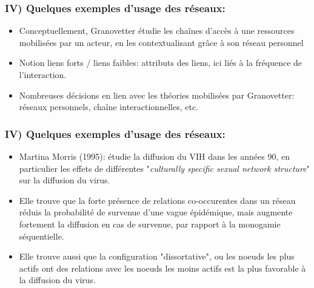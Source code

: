\documentclass{beamer}
\begin{document}
\begin{frame}
    \frametitle{IV) Quelques exemples d'usage des réseaux:}
    \begin{itemize}
        \item Conceptuellement, Granovetter étudie les chaînes d'accès à une ressources mobilisées par un acteur, en les contextualisant grâce à son réseau personnel
        \item Notion liens forts / liens faibles: attributs des liens, ici liés à la fréquence de l'interaction.
        \item Nombreuses décisions en lien avec les théories mobilisées par Granovetter: réseaux personnels, chaîne interactionnelles, etc.
    \end{itemize}
\end{frame}

\begin{frame}
    \frametitle{IV) Quelques exemples d'usage des réseaux:}
    \begin{itemize}
        \item Martina Morris (1995): étudie la diffusion du VIH dans les années 90, en particulier les effets de différentes "\emph{culturally specific sexual network structure}" sur la diffusion du virus.
        \item Elle trouve que la forte présence de relations co-occurentes dans un réseau réduis la probabilité de survenue d'une vague épidémique, mais augmente fortement la diffusion en cas de survenue, par rapport à la monogamie séquentielle. 
        \item Elle trouve aussi que la configuration "dissortative", ou les noeuds les plus actifs ont des relations avec les noeuds les moins actifs est la plus favorable à la diffusion du virus.
    \end{itemize}
\end{frame}
\end{document}
